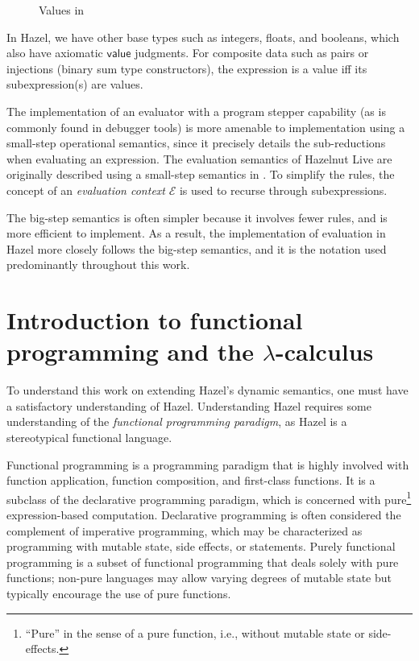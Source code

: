 \begin{figure}
  \centering
  \begin{mdframed}
    \begin{singlespace}
      \begin{mathpar}
      \end{mathpar}
    \end{singlespace}
  \end{mdframed}
  \caption{Values in \ulc}
  \label{fig:value-judgment}
\end{figure}

In Hazel, we have other base types such as integers, floats, and booleans, which also have axiomatic $\textsf{value}$ judgments. For composite data such as pairs or injections (binary sum type constructors), the expression is a value iff its subexpression(s) are values.

The implementation of an evaluator with a program stepper capability (as is commonly found in debugger tools) is more amenable to implementation using a small-step operational semantics, since it precisely details the sub-reductions when evaluating an expression. The evaluation semantics of Hazelnut Live are originally described using a small-step semantics in \cite{conf/popl/HazelnutLive19}. To simplify the rules, the concept of an \textit{evaluation context} $\mathcal{E}$ is used to recurse through subexpressions.

The big-step semantics is often simpler because it involves fewer rules, and is more efficient to implement. As a result, the implementation of evaluation in Hazel more closely follows the big-step semantics, and it is the notation used predominantly throughout this work.

\section{Introduction to functional programming and the $\lambda$-calculus}
\label{sec:fp-lc}

To understand this work on extending Hazel's dynamic semantics, one must have a satisfactory understanding of Hazel. Understanding Hazel requires some understanding of the \textit{functional programming paradigm}, as Hazel is a stereotypical functional language. 

Functional programming \cite{hughes1989functional} is a programming paradigm that is highly involved with function application, function composition, and first-class functions. It is a subclass of the declarative programming paradigm, which is concerned with pure\footnote{``Pure'' in the sense of a pure function, i.e., without mutable state or side-effects.} expression-based computation. Declarative programming is often considered the complement of imperative programming, which may be characterized as programming with mutable state, side effects, or statements. Purely functional programming is a subset of functional programming that deals solely with pure functions; non-pure languages may allow varying degrees of mutable state but typically encourage the use of pure functions.

